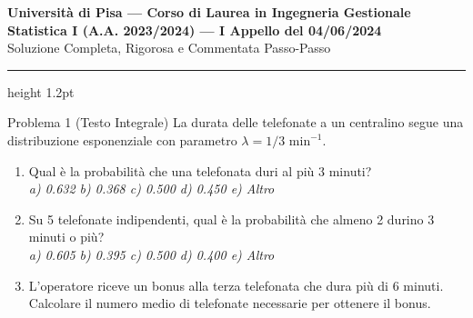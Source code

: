 \documentclass[11pt,a4paper]{article}
\begin{document}
\begin{center}
    {\LARGE\bfseries\color{navyblue} Università di Pisa --- Corso di Laurea in Ingegneria Gestionale}\\[0.4em]
    {\Large\bfseries Statistica I (A.A. 2023/2024) --- I Appello del 04/06/2024}\\[0.3em]
    {\large\textsf{Soluzione Completa, Rigorosa e Commentata Passo-Passo}}
\end{center}
\vspace{0.5em}
\hrule height 1.2pt
\vspace{1.5em}

\begin{problemabox}{Problema 1 (Testo Integrale)}
La durata delle telefonate a un centralino segue una distribuzione esponenziale con parametro $\lambda = 1/3\text{ min}^{-1}$.
\begin{enumerate}[label=(\alph*)]
    \item Qual è la probabilità che una telefonata duri al più 3 minuti?\\
    \emph{a) 0.632 \quad b) 0.368 \quad c) 0.500 \quad d) 0.450 \quad e) Altro}
    \item Su 5 telefonate indipendenti, qual è la probabilità che almeno 2 durino 3 minuti o più?\\
    \emph{a) 0.605 \quad b) 0.395 \quad c) 0.500 \quad d) 0.400 \quad e) Altro}
    \item L'operatore riceve un bonus alla terza telefonata che dura più di 6 minuti. Calcolare il numero medio di telefonate necessarie per ottenere il bonus.
\end{enumerate}
\end{problemabox}
\end{document}
